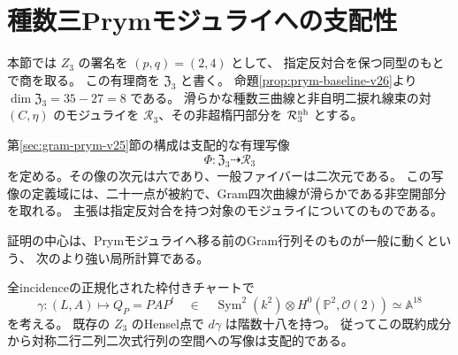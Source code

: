 \section{種数三Prymモジュライへの支配性}
\label{sec:prym-dominance-v26}

本節では $Z_3$ の署名を $(p,q)=(2,4)$ として、
指定反対合を保つ同型のもとで商を取る。
この有理商を $\mathfrak Z_3$ と書く。
命題\ref{prop:prym-baseline-v26}より
$\dim\mathfrak Z_3=35-27=8$ である。
滑らかな種数三曲線と非自明二捩れ線束の対 $(C,\eta)$ のモジュライを
$\mathcal R_3$、その非超楕円部分を $\mathcal R_3^{\rm nh}$ とする。

\begin{theorem}[Prymモジュライへの支配性]
\label{thm:prym-dominance-v26}
第\ref{sec:gram-prym-v25}節の構成は支配的な有理写像
\[
 \Phi:\mathfrak Z_3\dashrightarrow\mathcal R_3
\]
を定める。その像の次元は六であり、一般ファイバーは二次元である。
この写像の定義域には、二十一点が被約で、Gram四次曲線が滑らかである非空開部分を取れる。
主張は指定反対合を持つ対象のモジュライについてのものである。
\end{theorem}

証明の中心は、Prymモジュライへ移る前のGram行列そのものが一般に動くという、
次のより強い局所計算である。

\begin{proposition}[十八個のGram係数の独立性]
\label{prop:gram-differential-v26}
全incidenceの正規化された枠付きチャートで
\[
 \gamma:(L,A)\longmapsto Q_P=PAP^t
 \quad\in\quad
 \operatorname{Sym}^2(k^2)\otimes H^0(\mathbb P^2,\mathcal O(2))
 \simeq\mathbb A^{18}
\]
を考える。
既存の $Z_3$ のHensel点で $d\gamma$ は階数十八を持つ。
従ってこの既約成分から対称二行二列二次式行列の空間への写像は支配的である。
\end{proposition}


